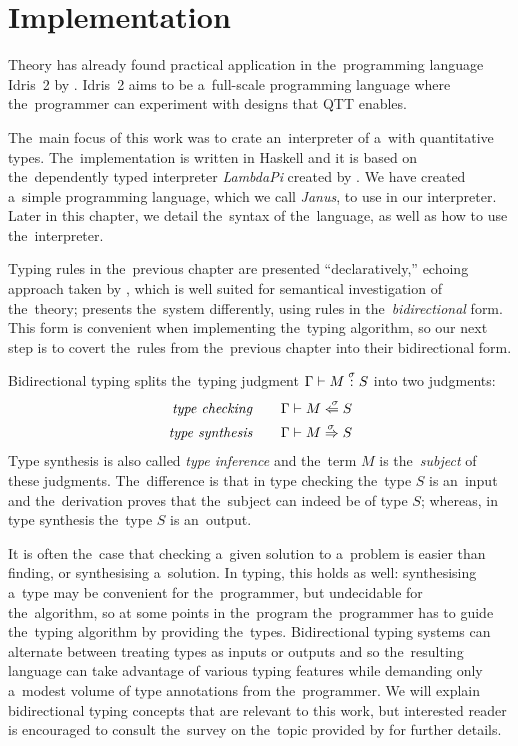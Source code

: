 \chapter{Implementation}

 Theory has already found practical
application in the~programming language Idris~2 by \citet{brady_2021}. Idris~2
aims to be a~full-scale programming language where the~programmer can experiment
with designs that QTT enables.

The~main focus of this work was to crate an~interpreter of a~\lc with
quantitative types. The~implementation is written in Haskell\citep{haskell_2010}
and it is based on the~dependently typed \lc interpreter \emph{LambdaPi} created
by \citet{loh_et_al_2010}. We have created a~simple programming language, which
we call \emph{Janus}, to use in our interpreter. Later in this chapter, we
detail the~syntax of the~language, as well as how to use the~interpreter.

Typing rules in the~previous chapter are presented ``declaratively,'' echoing
approach taken by \citet{atkey_2018}, which is well suited for semantical
investigation of the~theory; \citet{mcbride_2016} presents the~system
differently, using rules in the~\emph{bidirectional} form. This form is
convenient when implementing the~typing algorithm, so our next step is to covert
the~rules from the~previous chapter into their bidirectional form.

\label{sec:bidir_typing}

Bidirectional typing splits the~typing judgment $\Gamma \vdash M \overset{\sigma}: S$
into two judgments:
\begin{align*}
  \text{\emph{type checking}}\qquad &\Gamma \vdash M \overset{\;\;{\sigma}}{\Leftarrow} S \\
  \text{\emph{type synthesis}}\qquad &\Gamma \vdash M \overset{\!{\sigma}}\Rightarrow S
\end{align*}
Type synthesis is also called \emph{type inference} and the~term $M$ is
the~\emph{subject} of these judgments. The~difference is that in type checking
the~type $S$ is an~input and the~derivation proves that the~subject can indeed
be of type $S$; whereas, in type synthesis the~type $S$ is an~output.

It is often the~case that checking a~given solution to a~problem is easier than
finding, or synthesising a~solution. In typing, this holds as well: synthesising
a~type may be convenient for the~programmer, but undecidable for the~algorithm,
so at some points in the~program the~programmer has to guide the~typing
algorithm by providing the~types. Bidirectional typing systems can alternate
between treating types as inputs or outputs and so the~resulting language can
take advantage of various typing features while demanding only a~modest volume
of type annotations from the~programmer. We will explain bidirectional typing
concepts that are relevant to this work, but interested reader is encouraged to
consult the~survey on the~topic provided by \citet{dunfield_krishnaswami_2019}
for further details.

